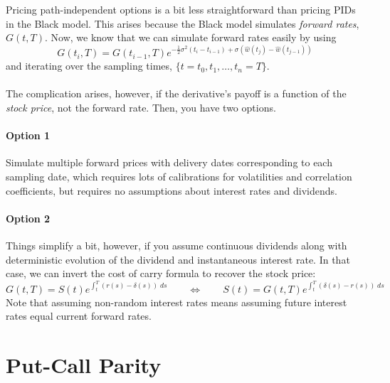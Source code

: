\documentclass[12pt]{article}
\theoremstyle{plain}
\theoremstyle{definition}
\theoremstyle{remark}
\begin{document}
Pricing path-independent options is a bit less straightforward than
pricing PIDs in the Black model. This arises because the 
Black model simulates \emph{forward rates}, $G(t,T)$. Now, we know
that we can simulate forward rates easily by using
   \[ G(t_i, T) = G(t_{i-1}, T) e^{-\frac{1}{2}\sigma^2 (t_i - t_{i-1})
      +\sigma (\hat{w}(t_j) - \hat{w}(t_{j-1}))} \]
and iterating over the sampling times, $\{ t = t_0, t_1, \ldots,
t_n=T\}$.
\\
\\
The complication arises, however, if the derivative's payoff is a 
function of the \emph{stock price}, not the forward rate. Then,
you have two options.

\paragraph{Option 1} Simulate multiple forward prices with delivery
dates corresponding to each sampling date, which 
requires lots of calibrations for volatilities and correlation
coefficients, but requires no assumptions about interest
rates and dividends.

\paragraph{Option 2} Things simplify a bit, however, if you assume
continuous dividends along with deterministic evolution of 
the dividend and instantaneous interest rate. In that case, we can
invert the cost of carry formula to recover the stock price:
   \[ G(t,T) = S(t) e^{\int^T_t (r(s) - \delta(s))\; ds} \qquad
      \Leftrightarrow \qquad
      S(t)= G(t,T) e^{\int^T_t ( \delta(s)- r(s) )\; ds} \]
Note that assuming non-random interest rates means assuming
future interest rates equal current forward rates.



\newpage

\section{Put-Call Parity}
\end{document}
